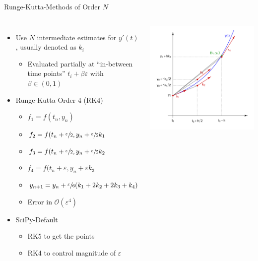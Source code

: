 \begin{frame}{Runge-Kutta-Methods of Order $N$}
%
\begin{columns}
\begin{itemize}
\item Use $N$ intermediate estimates for $y'(t)$, usually denoted as $k_i$
	\begin{itemize}
	\item Evaluated partially at \enquote{in-between time points} $t_i + \beta \varepsilon$ with $\beta \in (0, 1)$
	\end{itemize}
\item Runge-Kutta Order 4 (RK4)
	\begin{itemize}
	\item $f_1 = f(t_n, y_n)$
	\item $f_2 = f(t_n + \sfrac{\varepsilon}{2}, y_n + \sfrac{\varepsilon}{2} k_1$
	\item $f_3 = f(t_n + \sfrac{\varepsilon}{2}, y_n + \sfrac{\varepsilon}{2} k_2$
	\item $f_4 = f(t_n + \varepsilon, y_n + \varepsilon k_3$
	\item[\Thus] $y_{n+1} = y_n + \sfrac{\varepsilon}{6}(k_1 + 2k_2 + 2k_3 + k_4)$
	\item[\Thus] Error in $\mathcal{O}(\varepsilon^4)$
	\end{itemize}
\item SciPy-Default
	\begin{itemize}
	\item RK5 to get the points
	\item RK4 to control magnitude of $\varepsilon$
	\end{itemize}
\end{itemize}
%
\includegraphics[width=\linewidth]{./gfx/04-Runge-Kutta}


\end{columns}
\end{frame}
